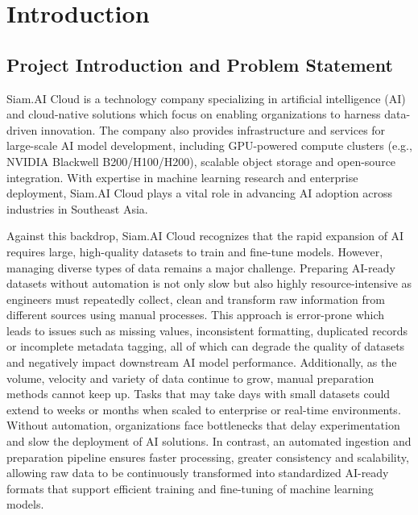 \documentclass[12pt,oneside,openright,a4paper]{cpe-english-project}
\begin{document}

\chapter{Introduction}

\section{Project Introduction and Problem Statement}

Siam.AI Cloud is a technology company specializing in artificial intelligence (AI) and cloud-native solutions which focus on enabling organizations to harness data-driven innovation. The company also provides infrastructure and services for large-scale AI model development, including GPU-powered compute clusters (e.g., NVIDIA Blackwell B200/H100/H200), scalable object storage and open-source integration. With expertise in machine learning research and enterprise deployment, Siam.AI Cloud plays a vital role in advancing AI adoption across industries in Southeast Asia.

Against this backdrop, Siam.AI Cloud recognizes that the rapid expansion of AI requires large, high-quality datasets to train and fine-tune models. However, managing diverse types of data remains a major challenge. Preparing AI-ready datasets without automation is not only slow but also highly resource-intensive as engineers must repeatedly collect, clean and transform raw information from different sources using manual processes. This approach is error-prone which leads to issues such as missing values, inconsistent formatting, duplicated records or incomplete metadata tagging, all of which can degrade the quality of datasets and negatively impact downstream AI model performance. Additionally, as the volume, velocity and variety of data continue to grow, manual preparation methods cannot keep up. Tasks that may take days with small datasets could extend to weeks or months when scaled to enterprise or real-time environments. Without automation, organizations face bottlenecks that delay experimentation and slow the deployment of AI solutions. In contrast, an automated ingestion and preparation pipeline ensures faster processing, greater consistency and scalability, allowing raw data to be continuously transformed into standardized AI-ready formats that support efficient training and fine-tuning of machine learning models.
\end{document}

